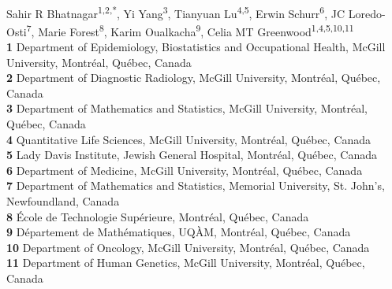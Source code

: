 \documentclass[10pt,letterpaper]{article}
\begin{document}
\vspace*{0.2in}

\begin{flushleft}
{\Large
\textbf{} %
}
\newline
\\
Sahir R Bhatnagar\textsuperscript{1,2,*},
Yi Yang\textsuperscript{3},
Tianyuan Lu\textsuperscript{4,5},
Erwin Schurr\textsuperscript{6},
JC Loredo-Osti\textsuperscript{7},
Marie Forest\textsuperscript{8},
Karim Oualkacha\textsuperscript{9},
Celia MT Greenwood\textsuperscript{1,4,5,10,11}
\\
\bigskip
\textbf{1} Department of Epidemiology, Biostatistics and Occupational Health, McGill University, Montréal, Québec, Canada
\\
\textbf{2} Department of Diagnostic Radiology, McGill University, Montréal, Québec, Canada
\\
\textbf{3} Department of Mathematics and Statistics, McGill University, Montréal, Québec, Canada
\\
\textbf{4} Quantitative Life Sciences, McGill University, Montréal, Québec, Canada
\\
\textbf{5} Lady Davis Institute, Jewish General Hospital, Montréal, Québec, Canada
\\
\textbf{6} Department of Medicine, McGill University, Montréal, Québec, Canada
\\
\textbf{7} Department of Mathematics and Statistics, Memorial University, St. John's, Newfoundland, Canada
\\
\textbf{8} École de Technologie Supérieure, Montréal, Québec, Canada
\\
\textbf{9} Département de Mathématiques, UQÀM, Montréal, Québec, Canada
\\
\textbf{10} Department of Oncology, McGill University, Montréal, Québec, Canada
\\
\textbf{11} Department of Human Genetics, McGill University, Montréal, Québec, Canada

\bigskip

% 
%


\end{flushleft}
\end{document}
